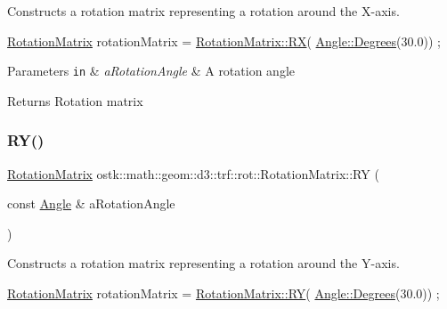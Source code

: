 Constructs a rotation matrix representing a rotation around the X-\/axis. 


\begin{DoxyCode}
\hyperlink{classostk_1_1math_1_1geom_1_1d3_1_1trf_1_1rot_1_1_rotation_matrix_a5e6bed0779ad7db0c5bf26b2bd96f8ba}{RotationMatrix} rotationMatrix = \hyperlink{classostk_1_1math_1_1geom_1_1d3_1_1trf_1_1rot_1_1_rotation_matrix_a569b426de68866d30093a8fbe9958731}{RotationMatrix::RX}(
      \hyperlink{classostk_1_1math_1_1geom_1_1_angle_a2cefda601167af07f61f0477776203ca}{Angle::Degrees}(30.0)) ;
\end{DoxyCode}



\begin{DoxyParams}[1]{Parameters}
\mbox{\tt in}  & {\em a\+Rotation\+Angle} & A rotation angle \\
\hline
\end{DoxyParams}
\begin{DoxyReturn}{Returns}
Rotation matrix 
\end{DoxyReturn}
\mbox{\label{classostk_1_1math_1_1geom_1_1d3_1_1trf_1_1rot_1_1_rotation_matrix_a4fceee0f8a617b37c34e1315ef877da8}} 
\subsubsection{\texorpdfstring{R\+Y()}{RY()}}
{\footnotesize\ttfamily \hyperlink{classostk_1_1math_1_1geom_1_1d3_1_1trf_1_1rot_1_1_rotation_matrix}{Rotation\+Matrix} ostk\+::math\+::geom\+::d3\+::trf\+::rot\+::\+Rotation\+Matrix\+::\+RY (\begin{DoxyParamCaption}\item[{const \hyperlink{classostk_1_1math_1_1geom_1_1_angle}{Angle} \&}]{a\+Rotation\+Angle }\end{DoxyParamCaption})\hspace{0.3cm}{\ttfamily [static]}}



Constructs a rotation matrix representing a rotation around the Y-\/axis. 


\begin{DoxyCode}
\hyperlink{classostk_1_1math_1_1geom_1_1d3_1_1trf_1_1rot_1_1_rotation_matrix_a5e6bed0779ad7db0c5bf26b2bd96f8ba}{RotationMatrix} rotationMatrix = \hyperlink{classostk_1_1math_1_1geom_1_1d3_1_1trf_1_1rot_1_1_rotation_matrix_a4fceee0f8a617b37c34e1315ef877da8}{RotationMatrix::RY}(
      \hyperlink{classostk_1_1math_1_1geom_1_1_angle_a2cefda601167af07f61f0477776203ca}{Angle::Degrees}(30.0)) ;
\end{DoxyCode}



